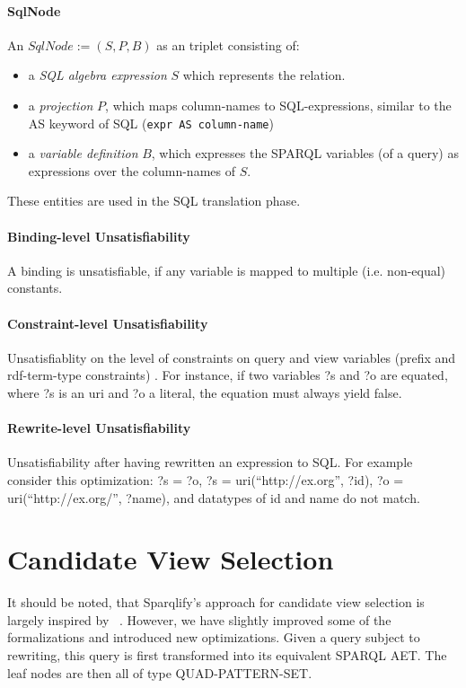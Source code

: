 \documentclass[a4paper,twoside,bibtotoc,abstracton,12pt,BCOR=15mm]{scrreprt}
\newcommand{\todo}[1]{\textbf{ToDo: \textit{#1}}}
\begin{document}
\paragraph{SqlNode}
An $SqlNode := (S, P, B)$ as an triplet consisting of:
\begin{itemize}
  \item a \emph{SQL algebra expression} $S$ which represents the relation.
  \item a \emph{projection} $P$, which maps column-names to SQL-expressions, similar to the AS keyword of SQL (\texttt{expr AS column-name})
  \item a \emph{variable definition} $B$, which expresses the SPARQL variables (of a query) as expressions over the column-names of $S$.
\end{itemize}
These entities are used in the SQL translation phase. 


\paragraph{Binding-level Unsatisfiability}
A binding is unsatisfiable, if any variable is mapped to multiple (i.e. non-equal) constants.

\paragraph{Constraint-level Unsatisfiability}
Unsatisfiablity on the level of constraints on query and view variables (prefix and rdf-term-type constraints) .
For instance, if two variables ?s and ?o are equated, where ?s is an uri and ?o a literal, the equation must always yield false.

\paragraph{Rewrite-level Unsatisfiability}
Unsatisfiability after having rewritten an expression to SQL.
For example consider this optimization: ?s = ?o, ?s = uri(``http://ex.org'', ?id), ?o = uri(``http://ex.org/'', ?name), and datatypes of
 id and name do not match. 



\section{Candidate View Selection}
It should be noted, that Sparqlify's approach for candidate view selection is largely inspired by ~\cite{rewriting-queries-on-sparql-views}.
However, we have slightly improved some of the formalizations and introduced new optimizations.
Given a query subject to rewriting, this query is first transformed into its equivalent SPARQL AET.
The leaf nodes are then all of type QUAD-PATTERN-SET.
\end{document}
